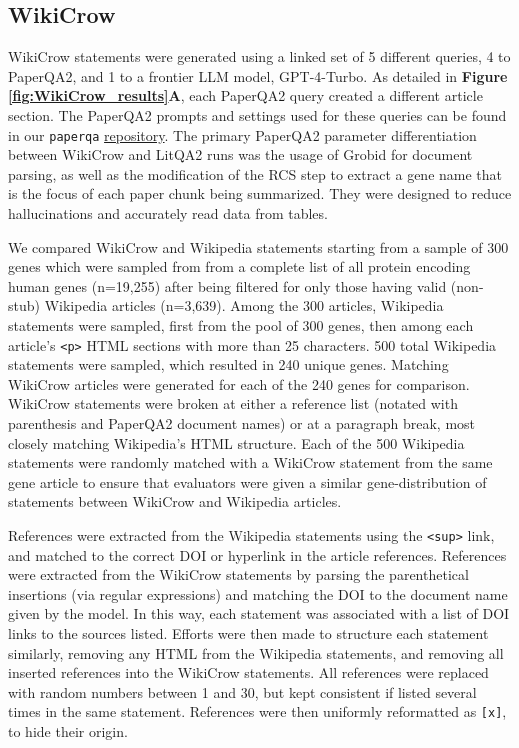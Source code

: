 \documentclass{article}
\begin{document}
\subsection{WikiCrow} \label{sec:si-wikicrow}

WikiCrow statements were generated using a linked set of 5 different queries, 4 to PaperQA2, and 1 to a frontier LLM model, GPT-4-Turbo. As detailed in \textbf{Figure \ref{fig:WikiCrow_results}A}, each PaperQA2 query created a different article section. The PaperQA2 prompts and settings used for these queries can be found in our \texttt{paperqa} \href{https://github.com/Future-House/paper-qa}{repository}. The primary PaperQA2 parameter differentiation between WikiCrow and LitQA2 runs was the usage of Grobid for document parsing, as well as the modification of the RCS step to extract a gene name that is the focus of each paper chunk being summarized. They were designed to reduce hallucinations and accurately read data from tables.

We compared WikiCrow and Wikipedia statements starting from a sample of 300 genes which were sampled from from a complete list of all protein encoding human genes \cite{enwiki:proteinlist} (n=19,255) after being filtered for only those having valid (non-stub) Wikipedia articles (n=3,639). Among the 300 articles, Wikipedia statements were sampled, first from the pool of 300 genes, then among each article's \texttt{<p>} HTML sections with more than 25 characters. 500 total Wikipedia statements were sampled, which resulted in 240 unique genes. Matching WikiCrow articles were generated for each of the 240 genes for comparison. WikiCrow statements were broken at either a reference list (notated with parenthesis and PaperQA2 document names) or at a paragraph break, most closely matching Wikipedia's HTML structure. Each of the 500 Wikipedia statements were randomly matched with a WikiCrow statement from the same gene article to ensure that evaluators were given a similar gene-distribution of statements between WikiCrow and Wikipedia articles. 

References were extracted from the Wikipedia statements using the \texttt{<sup>} link, and matched to the correct DOI or hyperlink in the article references. References were extracted from the WikiCrow statements by parsing the parenthetical insertions (via regular expressions) and matching the DOI to the document name given by the model. In this way, each statement was associated with a list of DOI links to the sources listed. Efforts were then made to structure each statement similarly, removing any HTML from the Wikipedia statements, and removing all inserted references into the WikiCrow statements. All references were replaced with random numbers between 1 and 30, but kept consistent if listed several times in the same statement. References were then uniformly reformatted as \texttt{[x]}, to hide their origin.
\end{document}
